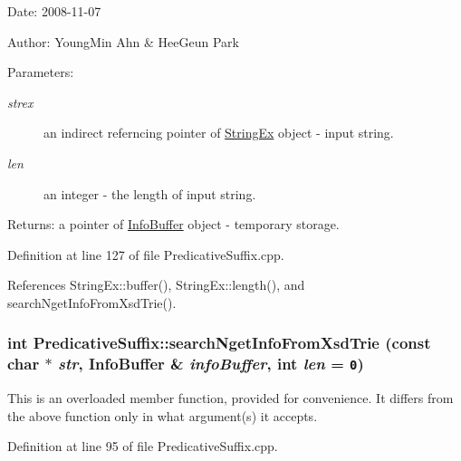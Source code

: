 \begin{Desc}
\item[Date:]2008-11-07 \end{Desc}
\begin{Desc}
\item[Author:]YoungMin Ahn \& HeeGeun Park \end{Desc}
\begin{Desc}
\item[Parameters:]
\begin{description}
\item[{\em strex}]an indirect referncing pointer of \hyperlink{classStringEx}{StringEx} object - input string. \item[{\em len}]an integer - the length of input string. \end{description}
\end{Desc}
\begin{Desc}
\item[Returns:]a pointer of \hyperlink{classkmaOrange_1_1InfoBuffer}{InfoBuffer} object - temporary storage. \end{Desc}


Definition at line 127 of file PredicativeSuffix.cpp.

References StringEx::buffer(), StringEx::length(), and searchNgetInfoFromXsdTrie().\hypertarget{classkmaOrange_1_1PredicativeSuffix_01937c1f0fb635d343568f2348cb3754}{
\subsubsection[{searchNgetInfoFromXsdTrie}]{\setlength{\rightskip}{0pt plus 5cm}int PredicativeSuffix::searchNgetInfoFromXsdTrie (const char $\ast$ {\em str}, \/  {\bf InfoBuffer} \& {\em infoBuffer}, \/  int {\em len} = {\tt 0})}}
\label{classkmaOrange_1_1PredicativeSuffix_01937c1f0fb635d343568f2348cb3754}


This is an overloaded member function, provided for convenience. It differs from the above function only in what argument(s) it accepts. 

Definition at line 95 of file PredicativeSuffix.cpp.

